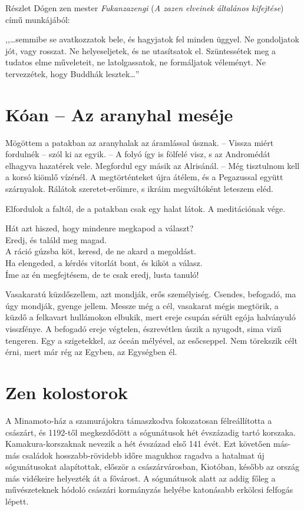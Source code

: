 Részlet Dógen zen mester \textit{Fukanzazengi} (\textit{A zazen
elveinek általános kifejtése}) című munkájából:

,,\dots semmibe se avatkozzatok bele, és hagyjatok fel minden üggyel.
Ne gondoljatok jót, vagy rosszat. Ne helyeseljetek, és ne utasítsatok el.
Szüntessétek meg a tudatos elme műveleteit, ne latolgassatok, ne
formáljatok véleményt. Ne tervezzétek, hogy Buddhák lesztek\dots''

\section{Kóan -- Az aranyhal meséje}

Mögöttem a patakban az aranyhalak az áramlással úsznak. -- Vissza
miért fordulnék -- szól ki az egyik. -- A folyó így is fölfelé visz, s az
Andromédát elhagyva hazatérek vele. Megfordul egy másik az Alrisánál.
-- Még tisztulnom kell a korsó kiömlő vízénél. A megtörténteket
újra átélem, és a Pegazussal együtt szárnyalok. Rálátok szeretet-erőimre,
s ikráim megváltóként leteszem eléd.

Elfordulok a faltól, de a patakban csak egy halat látok. A meditációnak vége.

\bigskip
\begin{Verse}
Hát azt hiszed, hogy mindenre megkapod a választ? \\
Eredj, és találd meg magad. \\
A ráció gúzsba köt, keresd, de ne akard a megoldást. \\
Ha elengeded, a kérdés vitorlát bont, és kiköt a válasz. \\
Íme az én megfejtésem, de te csak eredj, lusta tanuló!
\end{Verse}

\bigskip
Vasakaratú küzdőszellem, azt mondják, erős személyiség. Csendes,
befogadó, ma úgy mondják, gyenge jellem. Messze még a cél, vasakarat
mégis megtörik, a küzdő a felkavart hullámokon elbukik, mert ereje
csupán sérült egója halványuló visszfénye. A befogadó ereje végtelen,
észrevétlen úszik a nyugodt, sima vizű tengeren. Egy a szigetekkel, az
óceán mélyével, az esőcseppel. Nem törekszik célt érni, mert már rég
az Egyben, az Egységben él.

\section{Zen kolostorok}

A Minamoto-ház a szamurájokra támaszkodva fokozatosan félreállította
a császárt, és 1192-től megkezdődött a sógunátusok hét
évszázadig tartó korszaka. Kamakura-korszaknak nevezik a hét
évszázad első 141 évét. Ezt követően más-más családok hosszabb-rövidebb
időre magukhoz ragadva a hatalmat új sógunátusokat alapítottak,
először a császárvárosban, Kiotóban, később az ország más
vidékeire helyezték át a fővárost. A sógunátusok alatt az addig főleg
a művészeteknek hódoló császári kormányzás helyébe katonásabb
erkölcsi felfogás lépett.

